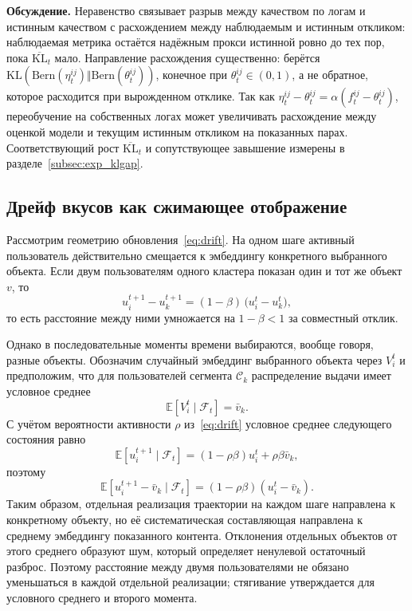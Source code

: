 \textbf{Обсуждение.} Неравенство связывает разрыв между качеством по логам и
истинным качеством с расхождением между наблюдаемым и истинным откликом:
наблюдаемая метрика остаётся надёжным прокси истинной ровно до тех пор, пока
$\overline{\mathrm{KL}}_t$ мало. Направление расхождения существенно: берётся
$\mathrm{KL}(\mathrm{Bern}(\eta_t^{ij})\Vert
\mathrm{Bern}(\theta_t^{ij}))$, конечное при $\theta_t^{ij}\in(0,1)$, а не
обратное, которое расходится при вырожденном отклике. Так как
$\eta_t^{ij}-\theta_t^{ij}=\alpha(f_t^{ij}-\theta_t^{ij})$, переобучение на
собственных логах может увеличивать расхождение между оценкой модели и текущим
истинным откликом на показанных парах. Соответствующий рост
$\overline{\mathrm{KL}}_t$ и сопутствующее завышение измерены в
разделе~\ref{subsec:exp_klgap}.

\subsection{Дрейф вкусов как сжимающее отображение}
\label{subsec:contraction}

Рассмотрим геометрию обновления~\eqref{eq:drift}. На одном шаге активный
пользователь действительно смещается к эмбеддингу конкретного выбранного
объекта. Если двум пользователям одного кластера показан один и тот же объект
$v$, то
\[
    u_i^{t+1}-u_k^{t+1} = (1-\beta)\,\bigl(u_i^{t}-u_k^{t}\bigr),
\]
то есть расстояние между ними умножается на $1-\beta<1$ за совместный отклик.

Однако в последовательные моменты времени выбираются, вообще говоря, разные
объекты. Обозначим случайный эмбеддинг выбранного объекта через $V_i^t$ и
предположим, что для пользователей сегмента $\mathcal C_k$ распределение выдачи
имеет условное среднее
\[
    \mathbb E[V_i^t\mid\mathcal F_t]=\bar v_k.
\]
С учётом вероятности активности $\rho$ из~\eqref{eq:drift} условное среднее
следующего состояния равно
\begin{equation}
    \mathbb E[u_i^{t+1}\mid\mathcal F_t]
    =(1-\rho\beta)u_i^t+\rho\beta\bar v_k,
    \label{eq:mean_contraction}
\end{equation}
поэтому
\[
    \mathbb E[u_i^{t+1}-\bar v_k\mid\mathcal F_t]
    =(1-\rho\beta)(u_i^t-\bar v_k).
\]
Таким образом, отдельная реализация траектории на каждом шаге направлена к
конкретному объекту, но её систематическая составляющая направлена к среднему
эмбеддингу показанного контента. Отклонения отдельных объектов от этого среднего
образуют шум, который определяет ненулевой остаточный разброс. Поэтому
расстояние между двумя пользователями не обязано уменьшаться в каждой отдельной
реализации; стягивание утверждается для условного среднего и второго момента.

